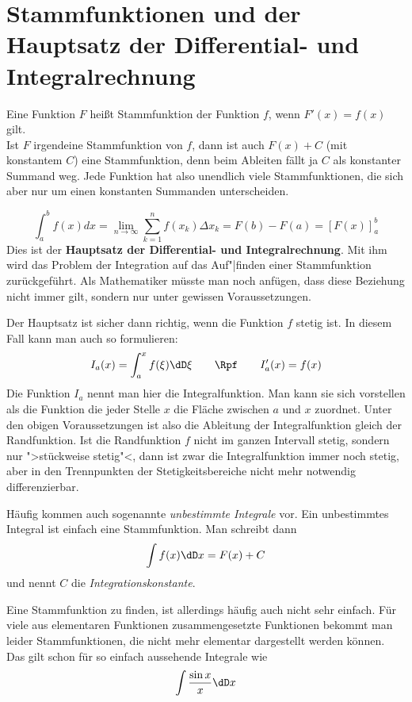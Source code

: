 \section{Stammfunktionen und der Hauptsatz der Differential- und Integralrechnung}
\begin{Definition}
  Eine Funktion $F$ heißt Stammfunktion der Funktion $f$, wenn $F'(x)=f(x)$
  gilt.\\
  Ist $F$ irgendeine Stammfunktion von $f$, dann ist auch $F(x)+C$ (mit
  konstantem $C$) eine Stammfunktion, denn beim Ableiten fällt ja $C$ als
  konstanter Summand weg. Jede Funktion hat also unendlich viele
  Stammfunktionen, die sich aber nur um einen konstanten Summanden
  unterscheiden.
\end{Definition}

\begin{equation}
  \int_a^b f(x)d x
  =\lim_{n\to\infty}\sum_{k=1}^n f(x_k)\Delta x_k = F(b) - F(a)
  =\left[F(x)\right]_a^b
\end{equation}
Dies ist der \textbf{Hauptsatz der Differential- und Integralrechnung}. Mit
ihm wird das Problem der Integration auf das Auf"|finden einer Stammfunktion
zurückgeführt. Als Mathematiker müsste man noch anfügen, dass diese Beziehung
nicht immer gilt, sondern nur unter gewissen Voraussetzungen.

Der Hauptsatz ist sicher dann richtig, wenn die Funktion $f$ stetig ist.
In diesem Fall kann man auch so formulieren:
\[
I_a(x)=\int_a^x f(\xi)\dD \xi \qquad\Rpf\qquad I_a'(x)=f(x)
\]
Die Funktion $I_a$ nennt man hier die Integralfunktion. Man kann sie sich
vorstellen als die Funktion die jeder Stelle $x$ die Fläche zwischen $a$ und
$x$ zuordnet. Unter den obigen Voraussetzungen ist also die Ableitung der
Integralfunktion gleich der Randfunktion. Ist die Randfunktion $f$ nicht im
ganzen Intervall stetig, sondern nur ">stückweise stetig"<, dann ist zwar die
Integralfunktion immer noch stetig, aber in den Trennpunkten der
Stetigkeitsbereiche nicht mehr notwendig differenzierbar.

Häufig kommen auch sogenannte \emph{unbestimmte Integrale} vor. Ein
unbestimmtes Integral ist einfach eine Stammfunktion. Man schreibt dann
\[
\int f(x)\dD x= F(x)+C
\]
und nennt $C$ die \emph{Integrationskonstante}.

Eine Stammfunktion zu finden, ist allerdings häufig auch nicht sehr einfach.
Für viele aus elementaren Funktionen zusammengesetzte Funktionen bekommt man
leider Stammfunktionen, die nicht mehr elementar dargestellt werden können. Das gilt
schon für so einfach aussehende Integrale wie
\[
\int \frac{\sin x}{x}\dD x
\]

